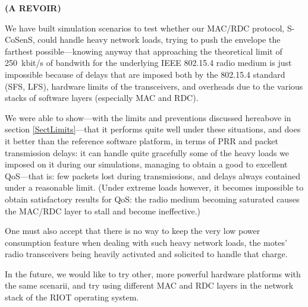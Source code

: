 \documentclass[conference]{IEEEtran}
\begin{document}
{\textbf{(A REVOIR)}}

We have built simulation scenarios to test whether our MAC/RDC protocol,
S-CoSenS, could handle heavy network loads, trying to push the envelope
the farthest possible---knowing anyway that approaching the theoretical
limit of 250~kbit/s of bandwith for the underlying IEEE 802.15.4 radio
medium is just impossible because of delays that are imposed both by
the 802.15.4 standard (SFS, LFS), hardware limits of the transceivers,
and overheads due to the various stacks of software layers (especially
MAC and RDC).

We were able to show---with the limits and preventions discussed hereabove
in section \ref{SectLimits}---that it performs quite well under these
situations, and does it better than the reference software platform, in terms
of PRR and packet transmission delays: it can handle quite gracefully some of
the heavy loads we imposed on it during our simulations, managing to obtain
a good to excellent QoS---that is: few packets lost during transmissions,
and delays always contained under a reasonable limit.
(Under extreme loads however, it becomes impossible to obtain satisfactory
results for QoS: the radio medium becoming saturated causes the MAC/RDC
layer to stall and become ineffective.)

One must also accept that there is no way to keep the very low power
consumption feature when dealing with such heavy network loads, the
motes' radio transceivers being heavily activated and solicited to
handle that charge.

\bigskip

In the future, we would like to try other, more powerful hardware platforms
with the same scenarii, and try using different MAC and RDC layers in
the network stack of the RIOT operating system.





\vfill

{\small
}
\end{document}
